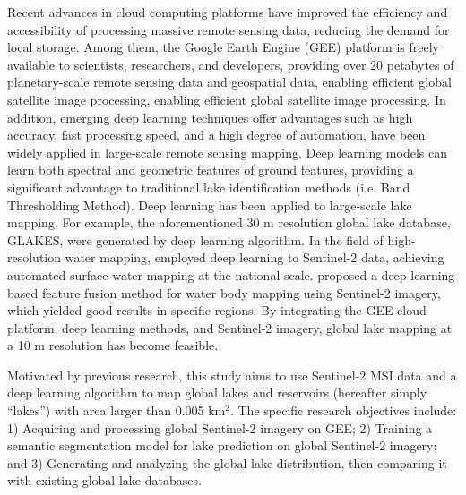 \documentclass[preprint,12pt,authoryear]{elsarticle}
\begin{document}
Recent advances in cloud computing platforms have improved the efficiency and accessibility of processing massive remote sensing data, reducing the demand for local storage. Among them, the Google Earth Engine (GEE) platform is freely available to scientists, researchers, and developers, providing over 20 petabytes of planetary-scale remote sensing data and geospatial data, enabling efficient global satellite image processing, enabling efficient global satellite image processing. In addition, emerging deep learning techniques offer advantages such as high accuracy, fast processing speed, and a high degree of automation, have been widely applied in large-scale remote sensing mapping. Deep learning models can learn both spectral and geometric features of ground features, providing a significant advantage to traditional lake identification methods (i.e. Band Thresholding Method). Deep learning has been applied to large-scale lake mapping. For example, the aforementioned 30 m resolution global lake database, GLAKES, were generated by deep learning algorithm. In the field of high-resolution water mapping, \citet{li_automatic_2021} employed deep learning to Sentinel-2 data, achieving automated surface water mapping at the national scale.\citet{manocha_mapping_2023} proposed a deep learning-based feature fusion method for water body mapping using Sentinel-2 imagery, which yielded good results in specific regions. By integrating the GEE cloud platform, deep learning methods, and Sentinel-2 imagery, global lake mapping at a 10 m resolution has become feasible.

Motivated by previous research, this study aims to use Sentinel-2 MSI data and a deep learning algorithm to map global lakes and reservoirs (hereafter simply “lakes”) with area larger than 0.005 km$^2$. The specific research objectives include: 1) Acquiring and processing global Sentinel-2 imagery on GEE; 2) Training a semantic segmentation model for lake prediction on global Sentinel-2 imagery; and 3) Generating and analyzing the global lake distribution, then comparing it with existing global lake databases.
\end{document}
